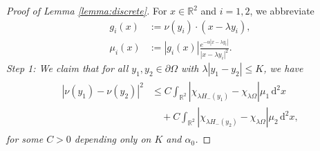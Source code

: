 \documentclass[11pt]{article}
\numberwithin{statement}{section}
\numberwithin{equation}{section}
\theoremstyle{remark}
\newcommand{\R}{\mathbb R} 				%
\newcommand{\intd}{\, \mathrm{d}} 				%
\begin{document}
\begin{proof}[Proof of Lemma \ref{lemma:discrete}]
  For $x\in \R^2$ and $i=1,2$, we abbreviate
	\begin{align}
          g_i(x)& := \nu(y_i) \cdot (x-\lambda y_i),\\
          \mu_i (x) &:= \left|g_i(x) \right|
                      \frac{e^{-\alpha|x-\lambda
                      y_i|}}{|x-\lambda y_i|^2}.
	\end{align}
	\textit{Step 1: We claim that for all $y_1, y_2 \in \partial
          \Omega$ with $\lambda | y_1- y_2| \leq K$, we have
	\begin{align}
	  \begin{split}
            |\nu(y_1 ) - \nu(y_2)|^2 & \leq C \int_{\R^2} \left|
              \chi_{\lambda H_-(y_1)} - \chi_{\lambda
                \Omega}
            \right| \mu_1 \intd^2 x \\
            & \quad + C \int_{\R^2} \left| \chi_{\lambda H_-(y_2)} -
              \chi_{\lambda \Omega} \right| \mu_2 \intd^2 x,
	  \end{split}
	\end{align}
        for some $C > 0$ depending only on $K$ and $\alpha_0$.}
      

\end{proof}
\end{document}
